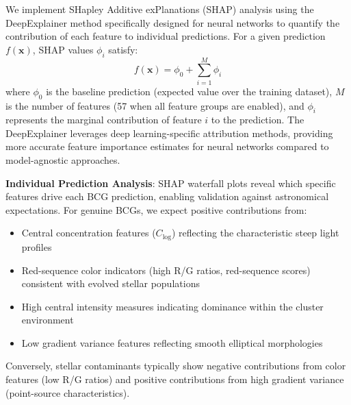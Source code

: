 \documentclass[twocolumn,10pt]{aastex631}
\begin{document}
We implement SHapley Additive exPlanations (SHAP) analysis using the DeepExplainer method specifically designed for neural networks to quantify the contribution of each feature to individual predictions. For a given prediction $f(\mathbf{x})$, SHAP values $\phi_i$ satisfy:
\begin{equation}
f(\mathbf{x}) = \phi_0 + \sum_{i=1}^{M} \phi_i
\end{equation}
where $\phi_0$ is the baseline prediction (expected value over the training dataset), $M$ is the number of features (57 when all feature groups are enabled), and $\phi_i$ represents the marginal contribution of feature $i$ to the prediction. The DeepExplainer leverages deep learning-specific attribution methods, providing more accurate feature importance estimates for neural networks compared to model-agnostic approaches.

\textbf{Individual Prediction Analysis}: SHAP waterfall plots reveal which specific features drive each BCG prediction, enabling validation against astronomical expectations. For genuine BCGs, we expect positive contributions from:
\begin{itemize}
\item Central concentration features ($C_{\text{log}}$) reflecting the characteristic steep light profiles
\item Red-sequence color indicators (high R/G ratios, red-sequence scores) consistent with evolved stellar populations
\item High central intensity measures indicating dominance within the cluster environment
\item Low gradient variance features reflecting smooth elliptical morphologies
\end{itemize}
Conversely, stellar contaminants typically show negative contributions from color features (low R/G ratios) and positive contributions from high gradient variance (point-source characteristics).
\end{document}
